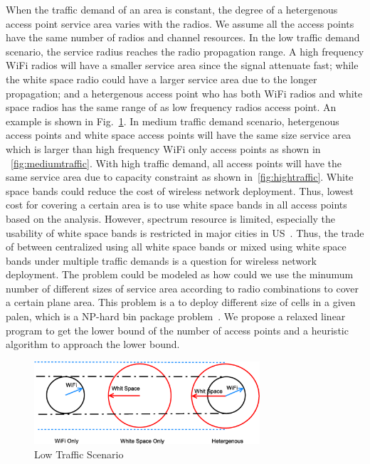 When the traffic demand of an area is constant, the degree of a hetergenous access point service area 
varies with the radios. We assume all the access points have the same number of radios and channel 
resources.
In the low traffic demand scenario, the service radius reaches the radio propagation range.
A high frequency WiFi radios will have a smaller service area since the signal attenuate fast; while the white
space radio could have a larger service area due to the longer propagation; and a hetergenous access point who has
both WiFi radios and white space radios has the same range of as low frequency radios access point. An example is
shown in Fig.~\ref{fig:lowtraffic}.
In medium traffic demand scenario, hetergenous access points and white space access points will 
have the same size service area which is larger than high frequency WiFi only access points as shown in 
~\ref{fig:mediumtraffic}.
With high traffic demand, all access points will have the same service area due to capacity constraint 
as shown in~\ref{fig:hightraffic}. White space bands could reduce the cost of wireless network deployment. 
Thus, lowest cost for covering a certain area is to use white space bands in all access points 
based on the analysis. However, spectrum resource is limited, especially the usability
of white space bands is restricted in major cities in US~\cite{msdatabase}. 
Thus, the trade of between centralized using all white space bands or mixed using white space
bands under multiple traffic demands is a question for wireless network deployment. The problem
could be modeled as how could we use the minumum number of different sizes of service area according to 
radio combinations to cover a certain plane area. This problem is a to deploy different size of cells in 
a given palen, which is a NP-hard bin package problem~\cite{martello1998exact}. We propose a relaxed 
linear program to get the lower bound of the number of access points and a heuristic algorithm to 
approach the lower bound.



\begin{figure}
\centering
\includegraphics[width=84mm]{figures/lowtraffic}
\vspace{-0.1in}
\caption{Low Traffic Scenario}                                                                 
\label{fig:lowtraffic}
\vspace{-0.1in}
\end{figure}


